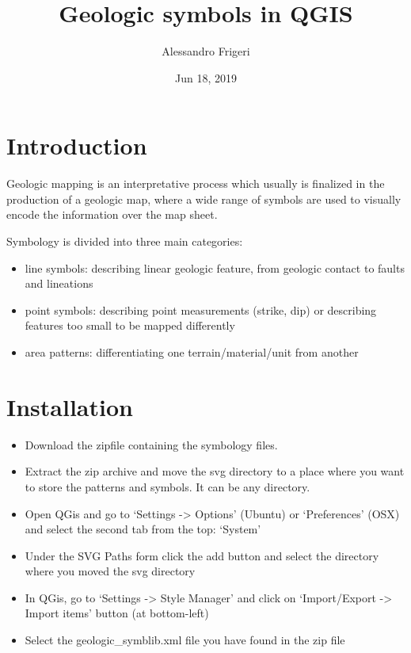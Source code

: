 \documentclass[letterpaper,10pt,english]{sphinxmanual}
\title{Geologic symbols in QGIS}
\date{Jun 18, 2019}
\author{Alessandro Frigeri}
\begin{document}
\pagestyle{empty}
\sphinxmaketitle
\pagestyle{plain}
\sphinxtableofcontents
\pagestyle{normal}
\label{\detokenize{index::doc}}



\chapter{Introduction}
\label{\detokenize{intro:introduction}}\label{\detokenize{intro::doc}}
Geologic mapping is an interpretative process which usually is finalized in the production of a geologic map, where a wide range of symbols are used to visually encode the information over the map sheet.

Symbology is divided into three main categories:
\begin{itemize}
\item {} 
line symbols: describing linear geologic feature, from geologic contact to faults and lineations

\item {} 
point symbols: describing point measurements (strike, dip) or describing features too small to be mapped differently

\item {} 
area patterns: differentiating one terrain/material/unit from another

\end{itemize}


\chapter{Installation}
\label{\detokenize{installation:installation}}\label{\detokenize{installation::doc}}\begin{itemize}
\item {} 
Download the zipfile containing the symbology files.

\item {} 
Extract the zip archive and move the svg directory to a place where you want to store the patterns and symbols. It can be any directory.

\item {} 
Open QGis and go to ‘Settings -\textgreater{} Options’ (Ubuntu) or ‘Preferences’ (OSX) and select the second tab from the top: ‘System’

\item {} 
Under the SVG Paths form click the add button and select the directory where you moved the svg directory

\item {} 
In QGis, go to ‘Settings -\textgreater{} Style Manager’ and click on ‘Import/Export -\textgreater{} Import items’ button (at bottom-left)

\item {} 
Select the geologic\_symblib.xml file you have found in the zip file

\end{itemize}
\end{document}
